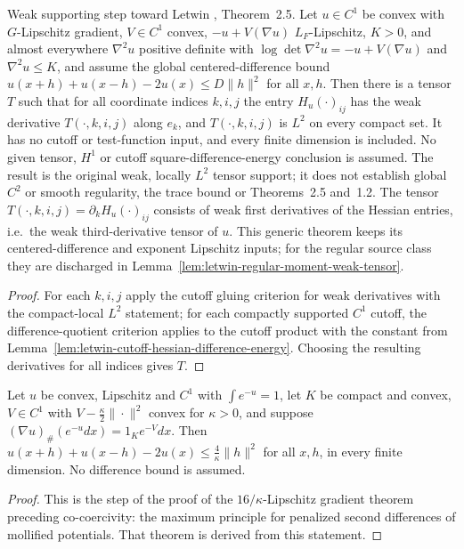 \begin{lemma}
  \label{lem:letwin-weak-third-derivative}
  \leanok
  Weak supporting step toward Letwin \cite{Letwin2026QuadraticKLS}, Theorem~2.5. Let $u\in C^1$ be convex with $G$-Lipschitz
  gradient, $V\in C^1$ convex, $-u+V(\nabla u)$ $L_F$-Lipschitz, $K>0$, and almost everywhere $\nabla^2u$ positive definite with
  $\log\det\nabla^2u=-u+V(\nabla u)$ and $\nabla^2u\le K$, and assume the global centered-difference bound
  $u(x+h)+u(x-h)-2u(x)\le D\|h\|^2$ for all $x,h$. Then there is a tensor $T$ such that for all coordinate indices $k,i,j$ the
  entry $H_u(\cdot)_{ij}$ has the weak derivative $T(\cdot,k,i,j)$ along $e_k$, and $T(\cdot,k,i,j)$ is $L^2$ on every compact
  set. It has no cutoff or test-function input, and every finite dimension is included.
  No given tensor, $H^1$ or cutoff square-difference-energy conclusion is assumed. The result is the original weak, locally
  $L^2$ tensor support; it does not establish global $C^2$ or smooth regularity, the trace bound or Theorems~2.5 and~1.2.
  The tensor $T(\cdot,k,i,j)=\partial_k H_u(\cdot)_{ij}$ consists of weak first derivatives of the Hessian entries, i.e.\ the
  weak third-derivative tensor of $u$. This generic theorem keeps its centered-difference and exponent Lipschitz inputs; for
  the regular source class they are discharged in Lemma~\ref{lem:letwin-regular-moment-weak-tensor}.
\end{lemma}
\begin{proof}
  \leanok
  For each $k,i,j$ apply the cutoff gluing criterion for weak derivatives with the compact-local $L^2$ statement; for each
  compactly supported $C^1$ cutoff, the difference-quotient criterion applies to the cutoff product with the constant from
  Lemma~\ref{lem:letwin-cutoff-hessian-difference-energy}. Choosing the resulting derivatives for all indices gives $T$.
\end{proof}

\begin{lemma}
  \label{lem:moment-map-second-difference}
  \leanok
  Let $u$ be convex, Lipschitz and $C^1$ with $\int e^{-u}=1$, let $K$ be compact and convex, $V\in C^1$ with
  $V-\frac\kappa2\|\cdot\|^2$ convex for $\kappa>0$, and suppose $(\nabla u)_\#(e^{-u}dx)=1_Ke^{-V}dx$. Then
  $u(x+h)+u(x-h)-2u(x)\le\frac4\kappa\|h\|^2$ for all $x,h$, in every finite dimension. No difference bound is assumed.
\end{lemma}
\begin{proof}
  \leanok
  This is the step of the proof of the $16/\kappa$-Lipschitz gradient theorem preceding co-coercivity: the maximum
  principle for penalized second differences of mollified potentials. That theorem is derived from this
  statement.
\end{proof}

